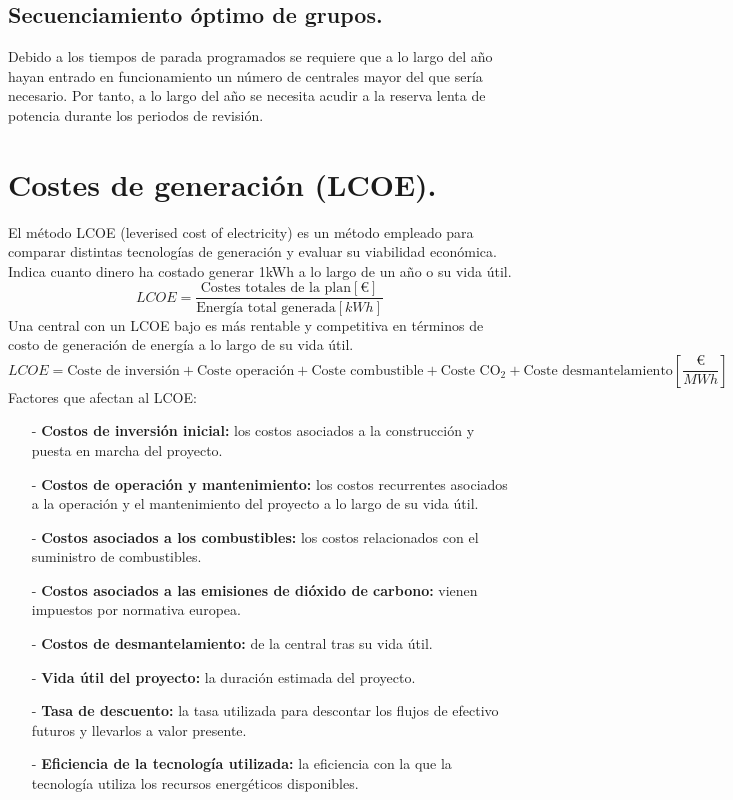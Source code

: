 \subsection{Secuenciamiento óptimo de grupos.}
Debido a los tiempos de parada programados se requiere que a lo largo del año
hayan entrado en funcionamiento un número de centrales mayor del que sería necesario. Por tanto, a lo largo del año se necesita acudir a la reserva
lenta de potencia durante los periodos de revisión.
\section{Costes de generación (LCOE).}
El método LCOE (leverised cost of electricity) es un método empleado para comparar distintas tecnologías de generación y evaluar su viabilidad económica. Indica cuanto dinero ha costado generar 1kWh a lo largo de un año o su vida útil.
\[LCOE=\frac{\text{Costes totales de la plan} [\euro{}]}{\text{Energía total generada}[kWh]}\]
Una central con un LCOE bajo es más rentable y competitiva en términos de costo de
generación de energía a lo largo de su vida útil.
\[LCOE=\text{Coste de inversión}+\text{Coste operación}+\text{Coste combustible}+\text{Coste CO}_2+\text{Coste desmantelamiento} \left[\frac{\euro}{MWh}\right]\]
Factores que afectan al LCOE:
\begin{itemize}
	\item [-]\textbf{Costos de inversión inicial:} los costos asociados a la construcción y puesta en marcha del
	proyecto.
	\item [-]\textbf{Costos de operación y mantenimiento:} los costos recurrentes asociados a la operación y el
	mantenimiento del proyecto a lo largo de su vida útil.
	\item [-]\textbf{Costos asociados a los combustibles:} los costos relacionados con el
	suministro de combustibles.
	\item [-]\textbf{Costos asociados a las emisiones de dióxido de carbono:} vienen impuestos por normativa europea.
	\item [-]\textbf{Costos de desmantelamiento:} de la central tras su vida útil.
	\item [-]\textbf{Vida útil del proyecto:} la duración estimada del proyecto.
	\item [-]\textbf{Tasa de descuento:} la tasa utilizada para descontar los flujos de efectivo futuros y llevarlos a valor
	presente.
	\item [-]\textbf{Eficiencia de la tecnología utilizada:} la eficiencia con la que la tecnología utiliza los recursos
	energéticos disponibles. 
\end{itemize}
